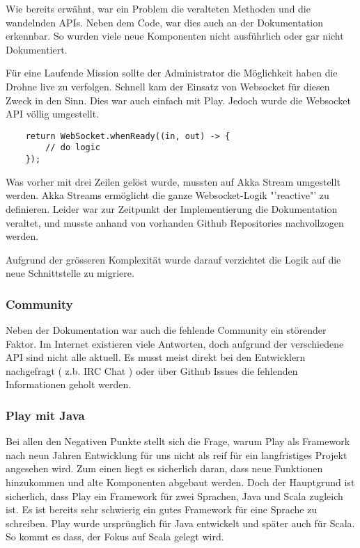 Wie bereits erwähnt, war ein Problem die veralteten Methoden und die wandelnden APIs.
Neben dem Code, war dies auch an der Dokumentation erkennbar.
So wurden viele neue Komponenten nicht ausführlich oder gar nicht Dokumentiert.

Für eine Laufende Mission sollte der Administrator die Möglichkeit haben die Drohne live zu verfolgen.
Schnell kam der Einsatz von Websocket für diesen Zweck in den Sinn.
Dies war auch einfach mit Play.
Jedoch wurde die Websocket API völlig umgestellt.
\begin{lstlisting}
    return WebSocket.whenReady((in, out) -> {
        // do logic
    });
\end{lstlisting}
Was vorher mit drei Zeilen gelöst wurde, mussten auf Akka Stream umgestellt werden. 
Akka Streams ermöglicht die ganze Websocket-Logik "'reactive"' zu definieren.
Leider war zur Zeitpunkt der Implementierung die Dokumentation veraltet, und musste anhand von vorhanden Github Repositories nachvollzogen werden. 

Aufgrund der grösseren Komplexität wurde darauf verzichtet die Logik auf die neue Schnittstelle zu migriere. 


\subsubsection{Community}
Neben der Dokumentation war auch die fehlende Community ein störender Faktor.
Im Internet existieren viele Antworten, doch aufgrund der verschiedene API sind nicht alle aktuell. 
Es musst meist direkt bei den Entwicklern nachgefragt ( z.b. IRC Chat ) oder über Github Issues \cite{github-ticket} die fehlenden Informationen geholt werden.

\subsubsection{Play mit Java}
Bei allen den Negativen Punkte stellt sich die Frage, warum Play als Framework nach neun Jahren Entwicklung für uns nicht als reif für ein langfristiges Projekt angesehen wird. 
Zum einen liegt es sicherlich daran, dass neue Funktionen hinzukommen und alte Komponenten abgebaut werden. 
Doch der Hauptgrund ist sicherlich, dass Play ein Framework für zwei Sprachen, Java und Scala zugleich ist. 
Es ist bereits sehr schwierig ein gutes Framework für eine Sprache zu schreiben. 
Play wurde ursprünglich für Java entwickelt und später auch für Scala. 
So kommt es dass, der Fokus auf Scala gelegt wird. 
